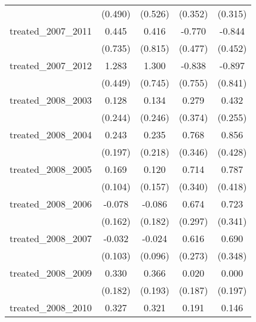 {\begin{tabular}{l*{4}{c}}
            &     (0.490)         &     (0.526)         &     (0.352)         &     (0.315)         \\
[1em]
treated\_2007\_2011&       0.445         &       0.416         &      -0.770         &      -0.844         \\
            &     (0.735)         &     (0.815)         &     (0.477)         &     (0.452)         \\
[1em]
treated\_2007\_2012&       1.283\sym{**} &       1.300         &      -0.838         &      -0.897         \\
            &     (0.449)         &     (0.745)         &     (0.755)         &     (0.841)         \\
[1em]
treated\_2008\_2003&       0.128         &       0.134         &       0.279         &       0.432         \\
            &     (0.244)         &     (0.246)         &     (0.374)         &     (0.255)         \\
[1em]
treated\_2008\_2004&       0.243         &       0.235         &       0.768\sym{*}  &       0.856\sym{*}  \\
            &     (0.197)         &     (0.218)         &     (0.346)         &     (0.428)         \\
[1em]
treated\_2008\_2005&       0.169         &       0.120         &       0.714\sym{*}  &       0.787         \\
            &     (0.104)         &     (0.157)         &     (0.340)         &     (0.418)         \\
[1em]
treated\_2008\_2006&      -0.078         &      -0.086         &       0.674\sym{*}  &       0.723\sym{*}  \\
            &     (0.162)         &     (0.182)         &     (0.297)         &     (0.341)         \\
[1em]
treated\_2008\_2007&      -0.032         &      -0.024         &       0.616\sym{*}  &       0.690\sym{*}  \\
            &     (0.103)         &     (0.096)         &     (0.273)         &     (0.348)         \\
[1em]
treated\_2008\_2009&       0.330         &       0.366         &       0.020         &       0.000         \\
            &     (0.182)         &     (0.193)         &     (0.187)         &     (0.197)         \\
[1em]
treated\_2008\_2010&       0.327         &       0.321         &       0.191         &       0.146         \\

\end{tabular}}
